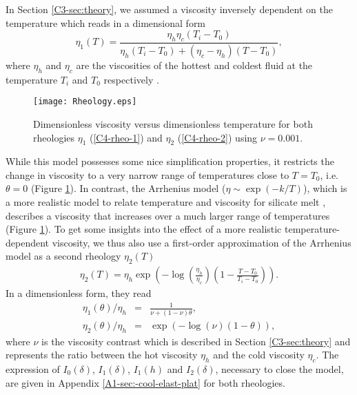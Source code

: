 In  Section  \ref{C3-sec:theory},  we assumed  a  viscosity  inversely
dependent on the temperature which reads in a dimensional form
\begin{equation}
  \eta_1(T)=\frac{\eta_h
    \eta_c(T_i-T_0)}{\eta_h(T_i-T_0)+(\eta_c-\eta_h)(T-T_0)},
\end{equation}
where $\eta_h$  and $\eta_c$  are the viscosities  of the  hottest and
coldest  fluid  at  the   temperature  $T_i$  and  $T_0$  respectively
\citep{Bercovici:2007vc}.
\begin{figure}[h!]
  \begin{center}
    \graphicspath{ {/Users/thorey/Documents/These/Projet/Refroidissement/Skin_Model/Figure/Figure_Heating/} }
    \texttt{[image: Rheology.eps]}
    \caption{Dimensionless viscosity  versus dimensionless temperature
      for  both  rheologies  $\eta_1$ (\ref{C4-rheo-1})  and  $\eta_2$
      (\ref{C4-rheo-2}) using $\nu=0.001$.}
    \label{C4-Rheology}
  \end{center}
\end{figure}
While  this model  possesses some  nice simplification  properties, it
restricts  the  change  in  viscosity   to  a  very  narrow  range  of
temperatures    close   to    $T=T_0$,   i.e.     $\theta=0$   (Figure
\ref{C4-Rheology}).     In     contrast,    the     Arrhenius    model
($\eta \sim  \exp(-k/T)$), which is  a more realistic model  to relate
temperature      and       viscosity      for       silicate      melt
\citep{Anonymous:CZVBrBvv,Blatt:2ViMWPc0,Crisp:1990gf,Costa:2003wk},
describes  a viscosity  that increases  over  a much  larger range  of
temperatures (Figure  \ref{C4-Rheology}).  To  get some  insights into
the  effect of  a more  realistic temperature-dependent  viscosity, we
thus also use a first-order approximation  of the Arrhenius model as a
second rheology $\eta_2(T)$ \citep{Diniega:2013eh}
\begin{eqnarray}
  \eta_2(T)                          =                          \eta_h
  \exp\left(-\log\left(\frac{\eta_h}{\eta_c}\right)\left(1-\frac{T-T_0}{T_i-T_0}\right)\right).
\end{eqnarray}
In a dimensionless form, they read
\begin{eqnarray}
  \eta_1(\theta)/\eta_h&=&\frac{1}{\nu+(1-\nu)\theta} ,\label{C4-rheo-1}\\
  \eta_2(\theta)/\eta_h&=&\exp\left(-\log(\nu)\left(1-\theta\right)\right),  \label{C4-rheo-2}
\end{eqnarray}
where $\nu$  is the viscosity  contrast which is described  in Section
\ref{C3-sec:theory} and represents the ratio between the hot viscosity
$\eta_h$  and   the  cold  viscosity  $\eta_c$.    The  expression  of
$I_0(\delta)$, $I_1(\delta)$, $I_1(h)$ and $I_2(\delta)$, necessary to
close the model, are  given in Appendix \ref{A1-sec:-cool-elast-plat}
  for both rheologies.

